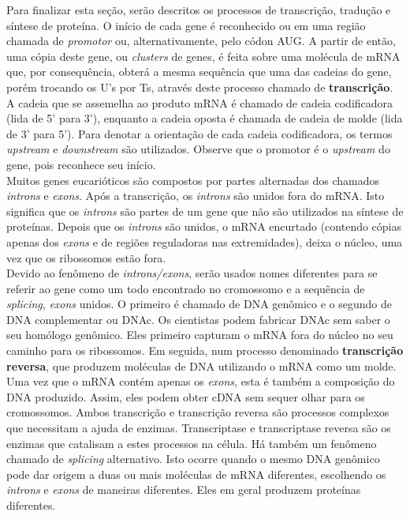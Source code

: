 \indent Para finalizar esta seção, serão descritos os processos de transcrição, tradução e síntese de proteína. O início de cada gene é reconhecido ou em uma região chamada de \textit{promotor} ou, alternativamente, pelo códon AUG. A partir de então, uma cópia deste gene, ou \textit{clusters} de genes, é feita sobre uma molécula de mRNA que, por consequência, obterá a mesma sequência que uma das cadeias do gene, porém trocando os U's por Ts, através deste processo chamado de \textbf{transcrição}. A cadeia que se assemelha ao produto mRNA é chamado de cadeia codificadora (lida de 5' para 3'), enquanto a cadeia oposta é chamada de cadeia de molde (lida de 3' para 5'). Para denotar a orientação de cada cadeia codificadora, os termos \textit{upstream} e \textit{downstream} são utilizados. Observe que o promotor é o \textit{upstream} do gene, pois reconhece seu início. \\






\indent  Muitos genes eucarióticos são compostos por partes alternadas dos chamados \textit{introns} e \textit{exons}. Após a transcrição, os \textit{introns} são unidos fora do mRNA. Isto significa que os \textit{introns} são partes de um gene que não são utilizados na síntese de proteínas. Depois que os \textit{introns} são unidos, o mRNA encurtado (contendo cópias apenas dos \textit{exons} e de regiões reguladoras nas extremidades), deixa o núcleo, uma vez que os ribossomos estão fora. \\

\indent Devido ao fenômeno de \textit{introns/exons}, serão usados nomes diferentes para se referir ao gene como um todo encontrado no cromossomo e a sequência de \textit{splicing}, \textit{exons} unidos. O primeiro é chamado de DNA genômico e o segundo de DNA complementar ou DNAc. Os cientistas podem fabricar DNAc sem saber o seu homólogo genômico. Eles primeiro capturam o mRNA fora do núcleo no seu caminho para os ribossomos. Em seguida, num processo denominado \textbf{transcrição reversa}, que produzem moléculas de DNA utilizando o mRNA como um molde. Uma vez que o mRNA contém apenas os \textit{exons}, esta é também a composição do DNA produzido. Assim, eles podem obter cDNA sem sequer olhar para os cromossomos. Ambos transcrição e transcrição reversa são processos complexos que necessitam a ajuda de enzimas. Transcriptase e transcriptase reversa são os enzimas que catalisam a estes processos na célula. Há também um fenômeno chamado de \textit{splicing} alternativo. Isto ocorre quando o mesmo DNA genômico pode dar origem a duas ou mais moléculas de mRNA diferentes, escolhendo os \textit{introns} e \textit{exons} de maneiras diferentes. Eles em geral produzem proteínas diferentes. \\

